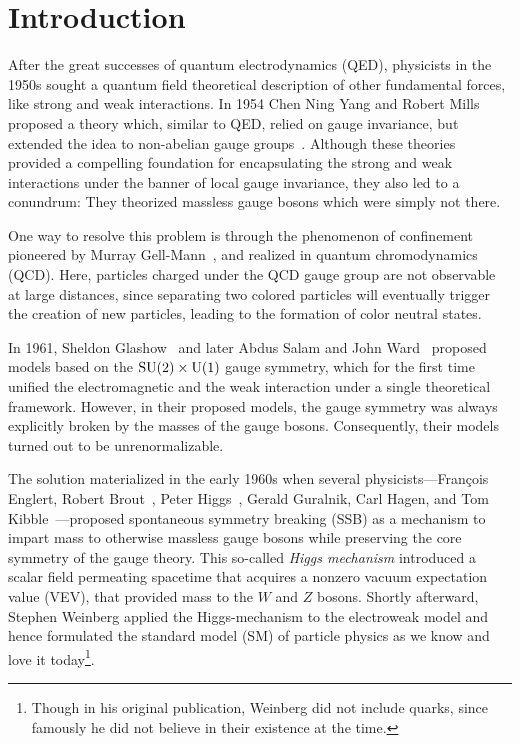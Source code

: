 
\chapter{Introduction}\label{chap:one}

After the great successes of quantum electrodynamics (\acs{QED}), physicists in the 1950s sought a quantum field theoretical description of other fundamental forces, like strong and weak interactions. In 1954 Chen Ning Yang and Robert Mills proposed a theory which, similar to \acs{QED}, relied on gauge invariance, but extended the idea to non-abelian gauge groups~\cite{Yang:1954ek}. Although these theories provided a compelling foundation for encapsulating the strong and weak interactions under the banner of local gauge invariance, they also led to a conundrum: They theorized massless gauge bosons which were simply not there.

One way to resolve this problem is through the phenomenon of confinement pioneered by Murray Gell-Mann~\cite{Gell-Mann:1961omu}, and realized in quantum chromodynamics (\acs{QCD}). Here, particles charged under the \acs{QCD} gauge group are not observable at large distances, since separating two colored particles will eventually trigger the creation of new particles, leading to the formation of color neutral states.

In 1961, Sheldon Glashow~\cite{Glashow:1961tr} and later Abdus Salam and John Ward~\cite{Salam:1964ry} proposed models based on the $\mathrm{SU}(2)\times \mathrm{U}(1)$ gauge symmetry, which for the first time unified the electromagnetic and the weak interaction under a single theoretical framework. However, in their proposed models, the gauge symmetry was always explicitly broken by the masses of the gauge bosons. Consequently, their models turned out to be unrenormalizable.

The solution materialized in the early 1960s when several physicists---François Englert, Robert Brout~\cite{Englert:1964et}, Peter Higgs~\cite{Higgs:1966ev}, Gerald Guralnik, Carl Hagen, and Tom Kibble~\cite{Guralnik:1964eu}---proposed spontaneous symmetry breaking (\acs{SSB}) as a mechanism to impart mass to otherwise massless gauge bosons while preserving the core symmetry of the gauge theory. This so-called \textit{Higgs mechanism} introduced a scalar field permeating spacetime that acquires a nonzero vacuum expectation value (\acs{VEV}), that provided mass to the $W$ and $Z$ bosons. Shortly afterward, Stephen Weinberg applied the Higgs-mechanism to the electroweak model and hence formulated the standard model (\acs{SM}) of particle physics as we know and love it today\footnote{Though in his original publication, Weinberg did not include quarks, since famously he did not believe in their existence at the time.}.

